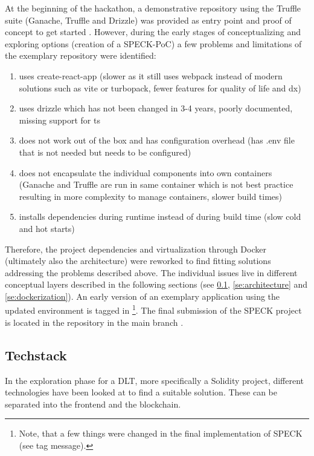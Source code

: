 \documentclass[oneside,a4paper,12pt, colorinlistoftodos]{article} %
\begin{document}
At the beginning of the hackathon, a demonstrative repository using the Truffle suite (Ganache, Truffle and Drizzle) was provided as entry point and proof of concept to get started \cite{drizzleWithEvents}. However, during the early stages of conceptualizing and exploring options (creation of a SPECK-PoC) a few problems and limitations of the exemplary repository were identified:

\begin{enumerate}
    \item \cite{drizzleWithEvents} uses create-react-app \cite{createReactApp} (slower as it still uses webpack instead of modern solutions such as vite or turbopack, fewer features for quality of life and \gls{dx})
    \item \cite{drizzleWithEvents} uses drizzle which has not been changed in 3-4 years, poorly documented, missing support for \gls{ts}
    \item \cite{drizzleWithEvents} does not work out of the box and has configuration overhead (has .env file that is not needed but needs to be configured)
    \item \cite{drizzleWithEvents} does not encapsulate the individual components into own containers (Ganache and Truffle are run in same container which is not best practice resulting in more complexity to manage containers, slower build times)
    \item \cite{drizzleWithEvents} installs dependencies during runtime instead of during build time (slow cold and hot starts)
\end{enumerate}

Therefore, the project dependencies and virtualization through Docker (ultimately also the architecture) were reworked to find fitting solutions addressing the problems described above. The individual issues live in different conceptual layers described in the following sections (see \ref{se:techstack}, \ref{se:architecture} and \ref{se:dockerization}). An early version of an exemplary application using the updated environment is tagged in \cite{wagmiExample}\footnote{Note, that a few things were changed in the final implementation of SPECK (see tag message).}. The final submission of the SPECK project is located in the repository in the main branch \cite{HellerAoun}.


\subsection{Techstack}\label{se:techstack}
In the exploration phase for a DLT, more specifically a Solidity project, different technologies have been looked at to find a suitable solution. These can be separated into the frontend and the blockchain. 
\end{document}
